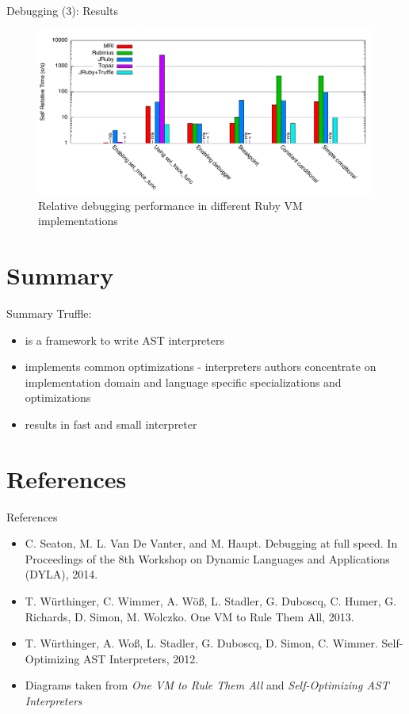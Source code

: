 \documentclass[xcolor=dvipsname]{beamer}
\begin{document}
\begin{frame}{Debugging (3): Results}
  \begin{figure}
    \includegraphics[width=\textwidth]{performance-debugging.pdf}
    \caption{Relative debugging performance in different Ruby VM implementations}
    \label{fig:debuggin_performance}
  \end{figure}
\end{frame}


\section{Summary}

\begin{frame}{Summary}
  Truffle:
  \begin{itemize}
    \item is a framework to write AST interpreters
    \item implements common optimizations - interpreters authors concentrate on implementation domain and language specific specializations and optimizations
    \item results in fast and small interpreter
  \end{itemize}
\end{frame}


\section{References}

\begin{frame}{References}
  \begin{itemize}
    \item C. Seaton, M. L. Van De Vanter, and M. Haupt. Debugging at full speed. In Proceedings of the 8th Workshop on Dynamic Languages and Applications (DYLA), 2014.
    \item T. Würthinger, C. Wimmer, A. Wöß, L. Stadler, G. Duboscq, C. Humer, G. Richards, D. Simon, M. Wolczko. One VM to Rule Them All, 2013.
    \item T. Würthinger, A. Woß, L. Stadler, G. Duboscq, D. Simon, C. Wimmer. Self-Optimizing AST Interpreters, 2012.

    \item Diagrams taken from \emph{One VM to Rule Them All} and \emph{Self-Optimizing AST Interpreters}
  \end{itemize}
\end{frame}
\end{document}
